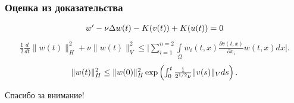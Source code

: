 \documentclass[10pt, pdf, hyperref={unicode}]{beamer}
\begin{document}
  \begin{frame}
    \frametitle{Оценка из доказательства}
    \begin{center}
      \begin{minipage}[h]{0.97\linewidth}
    \begin{equation}\label{eq:5.12}
      \begin{gathered}
        $$w^\prime - \nu\Delta w(t) - K(v(t)) + K(u(t)) = 0$$
      \end{gathered}
    \end{equation}
      \begin{equation}\label{eq:5.37}
        \begin{gathered}
            \frac{1}{2}\frac{d}{dt}\| w(t)\|_H^2+\nu\| w(t)\|_V^2\le
            \bigg|\sum_{i=1}^{n=2}\int\limits_\Omega w_i(t, x)\frac{\partial v(t, x)}{\partial x_i}w(t, x)dx\bigg|.
        \end{gathered}
    \end{equation}
    \begin{equation}\label{eq:5.38}
        \begin{gathered}
        $$\| w(t)\|_H^2\le\| w(0)\|_H^2\exp\left(\int_0^t\frac{1}{2^{1/2}\nu}\| v(s)\|_Vds\right).$$
        \end{gathered}
    \end{equation}
      \end{minipage}
    \end{center}
  \end{frame}

  \begin{frame}
    \begin{alertblock}{}
      \centerline{\large Спасибо за внимание!}
    \end{alertblock}
  \end{frame}
\end{document}
